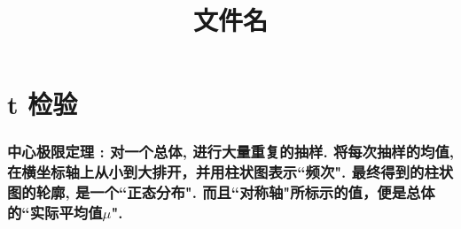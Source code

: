\documentclass[UTF8]{ctexart}
\title{文件名}
\begin{document}
	\tableofcontents %
	\date{} %
	\maketitle  %
	
	
	\part{t 检验}
	
	\section{中心极限定理 : 对一个总体, 进行大量重复的抽样. 将每次抽样的均值, 在横坐标轴上从小到大排开，并用柱状图表示``频次". 最终得到的柱状图的轮廓, 是一个``正态分布". 而且``对称轴"所标示的值，便是总体的``实际平均值$\mu$".}
	
\end{document}
